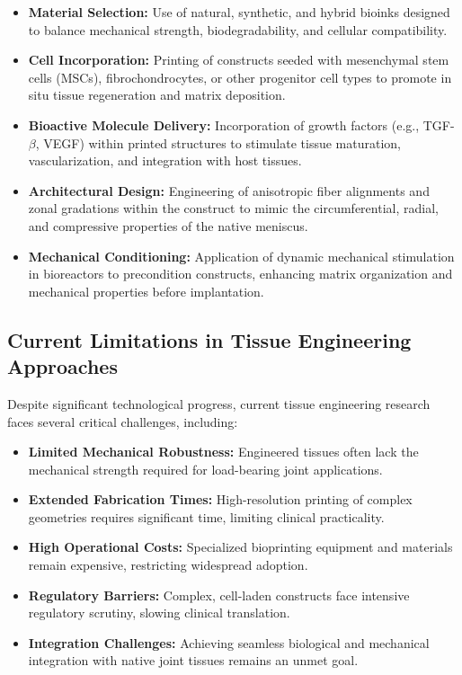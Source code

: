 \begin{itemize}
    \item \textbf{Material Selection:} Use of natural, synthetic, and hybrid bioinks designed to balance mechanical strength, biodegradability, and cellular compatibility.

    \item \textbf{Cell Incorporation:} Printing of constructs seeded with mesenchymal stem cells (MSCs), fibrochondrocytes, or other progenitor cell types to promote in situ tissue regeneration and matrix deposition.

    \item \textbf{Bioactive Molecule Delivery:} Incorporation of growth factors (e.g., TGF-\(\beta\), VEGF) within printed structures to stimulate tissue maturation, vascularization, and integration with host tissues.

    \item \textbf{Architectural Design:} Engineering of anisotropic fiber alignments and zonal gradations within the construct to mimic the circumferential, radial, and compressive properties of the native meniscus.

    \item \textbf{Mechanical Conditioning:} Application of dynamic mechanical stimulation in bioreactors to precondition constructs, enhancing matrix organization and mechanical properties before implantation.
\end{itemize}


\subsection{Current Limitations in Tissue Engineering Approaches}

Despite significant technological progress, current tissue engineering research faces several critical challenges, including:

\begin{itemize}
    \item \textbf{Limited Mechanical Robustness:} Engineered tissues often lack the mechanical strength required for load-bearing joint applications.
    
    \item \textbf{Extended Fabrication Times:} High-resolution printing of complex geometries requires significant time, limiting clinical practicality.
    
    \item \textbf{High Operational Costs:} Specialized bioprinting equipment and materials remain expensive, restricting widespread adoption.
    
    \item \textbf{Regulatory Barriers:} Complex, cell-laden constructs face intensive regulatory scrutiny, slowing clinical translation.
    
    \item \textbf{Integration Challenges:} Achieving seamless biological and mechanical integration with native joint tissues remains an unmet goal.
\end{itemize}

